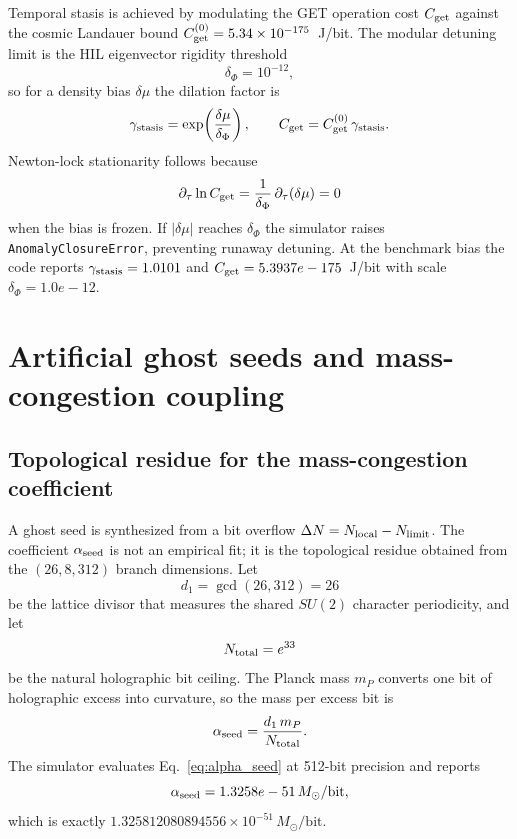 \documentclass[aps,pra,10pt,onecolumn,superscriptaddress,nofootinbib,longbibliography,floatfix]{revtex4-2}
\newcommand{\ExoticStasisScale}{1.0e-12}%
\newcommand{\ExoticStasisGamma}{1.0101}%
\newcommand{\ExoticCget}{5.3937e-175}%
\newcommand{\ExoticAlphaSeed}{1.3258e-51}%
\begin{document}
Temporal stasis is achieved by modulating the GET operation cost $C_{\rm get}$ against the cosmic Landauer bound $C_{\rm get}^{(0)} = 5.34 \times 10^{-175}$~J/bit.  The modular detuning limit is the HIL eigenvector rigidity threshold
%
\begin{equation}
\delta_\Phi = 10^{-12} ,
\end{equation}
%
so for a density bias $\delta\mu$ the dilation factor is
%
\begin{equation}
\gamma_{\rm stasis} = \exp\!\left(\frac{\delta\mu}{\delta_\Phi}\right),
\qquad
C_{\rm get} = C_{\rm get}^{(0)} \, \gamma_{\rm stasis} .
\label{eq:newton_lock}
\end{equation}
%
Newton-lock stationarity follows because
%
\begin{equation}
\partial_\tau \ln C_{\rm get}
= \frac{1}{\delta_\Phi} \, \partial_\tau (\delta\mu)
= 0
\label{eq:stationarity}
\end{equation}
%
when the bias is frozen.  If $|\delta\mu|$ reaches $\delta_\Phi$ the simulator raises \texttt{AnomalyClosureError}, preventing runaway detuning.  At the benchmark bias the code reports $\gamma_{\rm stasis} = \ExoticStasisGamma{}$ and $C_{\rm get} = \ExoticCget{}$~J/bit with scale $\delta_\Phi = \ExoticStasisScale{}$.

\section{Artificial ghost seeds and mass-congestion coupling}

\subsection{Topological residue for the mass-congestion coefficient}

A ghost seed is synthesized from a bit overflow $\Delta N = N_{\rm local} - N_{\rm limit}$.  The coefficient $\alpha_{\rm seed}$ is not an empirical fit; it is the topological residue obtained from the $(26,8,312)$ branch dimensions.  Let
%
\begin{equation}
d_1 = \gcd(26, 312) = 26
\end{equation}
%
be the lattice divisor that measures the shared $SU(2)$ character periodicity, and let
%
\begin{equation}
N_{\rm total} = e^{33}
\end{equation}
%
be the natural holographic bit ceiling.  The Planck mass $m_P$ converts one bit of holographic excess into curvature, so the mass per excess bit is
%
\begin{equation}
\alpha_{\rm seed} = \frac{d_1 \, m_P}{N_{\rm total}} .
\label{eq:alpha_seed}
\end{equation}
%
The simulator evaluates Eq.~\eqref{eq:alpha_seed} at 512-bit precision and reports
%
\begin{equation}
\alpha_{\rm seed} = \ExoticAlphaSeed{} \, M_{\odot}/\text{bit} ,
\end{equation}
%
which is exactly $1.325812080894556 \times 10^{-51} \, M_{\odot}/\text{bit}$.
\end{document}
